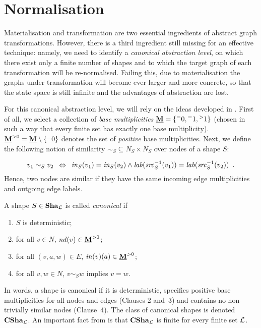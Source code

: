 \section{Normalisation}

Materialisation and transformation are
two essential ingredients of abstract graph transformations. However, there is
a third ingredient still missing for an effective technique: namely, we need to
identify a \emph{canonical abstraction level}, on which there exist only a
finite number of shapes and to which the target graph of each transformation
will be re-normalised. Failing this, due to materialisation the graphs under
transformation will become ever larger and more concrete, so that the state
space is still infinite and the advantages of abstraction are lost.

For this canonical abstraction level, we will rely on the ideas developed in
\cite{Rens04-esop}. First of all, we select a collection of {\em
base multiplicities} $\underline{\mathbf{M}}={\{ {{}^{=}{0}}, {{}^{=}{1}}, {{}^{>}{1}} \}}$ (chosen in such a way
that every finite set has exactly one base multiplicity). $\underline{\mathbf{M}}^{>0}=\underline{\mathbf{M}}
\setminus {\{ {\ensuremath{{}^{=}{0}}} \}}$ denotes the set of {\em positive} base multiplicities.
Next, we define the following notion of similarity ${\sim_S} \subseteq N_S
\times N_S$ over nodes of a shape $S$:

\begin{equation}\eqlabel{sim}
   v_1 \sim_S v_2 \enspace\Leftrightarrow\enspace 
       \inMult_S(v_1)=\inMult_S(v_2) \wedge 
       \lab(\src^{-1}_S(v_1))=\lab(\src^{-1}_S(v_2)) \enspace.
\end{equation}
%
Hence, two nodes are similar if they have the same incoming edge multiplicities
and outgoing edge labels.
%
\begin{definition}
A shape $S\in \mathbf{Sha}_{\cal L}$ is called {\em canonical} if
\begin{enumerate}\smalltopsep\noitemsep
\item $S$ is deterministic;
\item for all $v \in N$, $\mathit{nd}(v) \in \underline{\mathbf{M}}^{>0}$;
\item for all $(v,a,w) \in E$, $\mathit{in}(v)(a)\in \underline{\mathbf{M}}^{>0}$;
\item for all $v,w \in N$, $v \sim_S w$ implies $v=w$.
\end{enumerate}
\end{definition}
%
In words, a shape is canonical if it is deterministic, specifies positive base
multiplicities for all nodes and edges (Clauses 2 and~3) and contains no
non-trivially similar nodes (Clause~4).%
The class of canonical shapes is denoted $\mathbf{CSha}_{\cal L}$. An
important fact from \cite{Rens04-esop} is that $\mathbf{CSha}_{\cal L}$ is finite for every
finite set ${\cal L}$.


